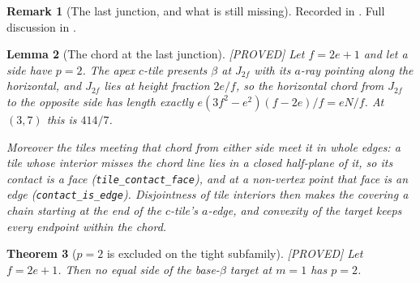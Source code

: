 \documentclass[11pt,reqno]{amsart}
\theoremstyle{plain}
\newtheorem{theorem}{Theorem}
\newtheorem{lemma}[theorem]{Lemma}
\theoremstyle{definition}
\newtheorem{remark}[theorem]{Remark}
\newcommand{\lab}[1]{\hfill\textnormal{\footnotesize\textsc{[#1]}}}
\begin{document}
\begin{remark}[The last junction, and what is still missing]\label{rem:lastjunction}
Recorded in \cite{Obstructions}. Full discussion in \cite{Obstructions}.
\end{remark}

\begin{lemma}[The chord at the last junction]\label{lem:chord}\lab{PROVED}
Let $f=2e+1$ and let a side have $p=2$. The apex $c$-tile presents $\beta$ at $J_{2f}$ with its
$a$-ray pointing along the horizontal, and $J_{2f}$ lies at height fraction $2e/f$, so the horizontal
chord from $J_{2f}$ to the opposite side has length exactly $e(3f^2-e^2)(f-2e)/f=eN/f$. At $(3,7)$
this is $414/7$.

Moreover the tiles meeting that chord from either side meet it in \emph{whole} edges: a tile whose
interior misses the chord line lies in a closed half-plane of it, so its contact is a face
(\texttt{tile\_contact\_face}), and at a non-vertex point that face is an edge
(\texttt{contact\_is\_edge}). Disjointness of tile interiors then makes the covering a chain starting
at the end of the $c$-tile's $a$-edge, and convexity of the target keeps every endpoint within the
chord.
\end{lemma}

\begin{theorem}[$p=2$ is excluded on the tight subfamily]\label{thm:ptwodead}\lab{PROVED}
Let $f=2e+1$. Then no equal side of the base-$\beta$ target at $m=1$ has $p=2$.
\end{theorem}
\end{document}
